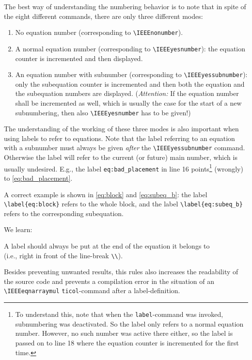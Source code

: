 \documentclass[a4paper,11pt]{article}
\begin{document}
The best way of understanding the numbering behavior is to note that
in spite of the eight different commands, there are only three
different modes:
\begin{enumerate}
\item No equation number (corresponding to \verb+\IEEEnonumber+).
\item A normal equation number (corresponding to
  \verb+\IEEEyesnumber+): the equation counter is incremented and then
  displayed.
\item An equation number with subnumber (corresponding to
  \verb+\IEEEyessubnumber+): only the subequation counter is
  incremented and then both the equation and the subequation numbers
  are displayed. (\emph{Attention:} If the equation number shall be
  incremented as well, which is usually the case for the start of a
  new subnumbering, then also \verb+\IEEEyesnumber+ has to be given!)
\end{enumerate}
The understanding of the working of these three modes is also
important when using labels to refer to equations. Note that the label
referring to an equation with a subnumber must always be given
\emph{after} the \verb+\IEEEyessubnumber+ command. Otherwise the label
will refer to the current (or future) main number, which is usually
undesired. E.g., the label \verb+eq:bad_placement+ in line 16
points\footnote{To understand this, note that when the
  \texttt{label}-command was invoked, subnumbering was deactivated. So
  the label only refers to a normal equation number. However, no such
  number was active there either, so the label is passed on to line 18
  where the equation counter is incremented for the first time.}
(wrongly) to \eqref{eq:bad_placement}.

A correct example is shown in \eqref{eq:block} and \eqref{eq:subeq_b}:
the label \verb+\label{eq:block}+ refers to the whole block, and the
label \verb+\label{eq:subeq_b}+ refers to the corresponding
subequation.

We learn:
\begin{whitebox}
  \centering
  A label should always be put at the end of the equation it belongs
  to\\(i.e., right in front of the line-break \verb+\\+).
\end{whitebox}
Besides preventing unwanted results, this rules also increases the
readability of the source code and prevents a compilation error in the
situation of an \verb+\IEEEeqnarraymul+ \verb+ticol+-command after a
label-definition. 
\end{document}
